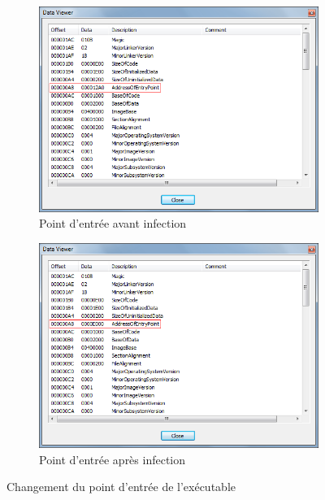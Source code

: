 \newpage

    \begin{figure}[H]
        \centering
        \begin{subfigure}{0.9\textwidth}
            \centering
            \includegraphics[width=\textwidth]{images/entrypoint_avant.png}
            \caption{Point d'entrée avant infection}
            \label{entrypoint_avant}
        \end{subfigure}
        \hfill
        \begin{subfigure}{0.9\textwidth}
            \centering
            \includegraphics[width=\textwidth]{images/entrypoint_after.png}
            \caption{Point d'entrée après infection}
            \label{entrypoint_apres}
        \end{subfigure}
        \hfill
        \caption{Changement du point d'entrée de l'exécutable}
        \label{entrypoint_changement}
    \end{figure}

